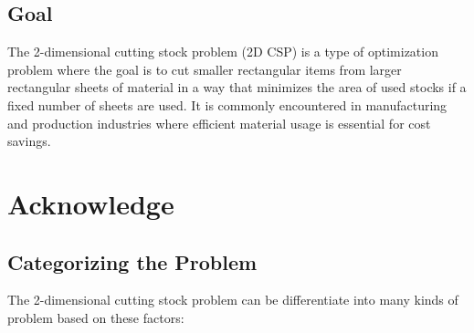 \documentclass[a4paper]{article}
\begin{document}
\subsection{Goal}
The 2-dimensional cutting stock problem (2D CSP)  is a type of optimization problem where the goal is to cut smaller rectangular items from larger rectangular sheets of material in a way that minimizes the area of used stocks if a fixed number of sheets are used. It is commonly encountered in manufacturing and production industries where efficient material usage is essential for cost savings.

\section{Acknowledge}
\subsection{Categorizing the Problem}
The 2-dimensional cutting stock problem can be differentiate into many kinds of problem based on these factors:
\end{document}
